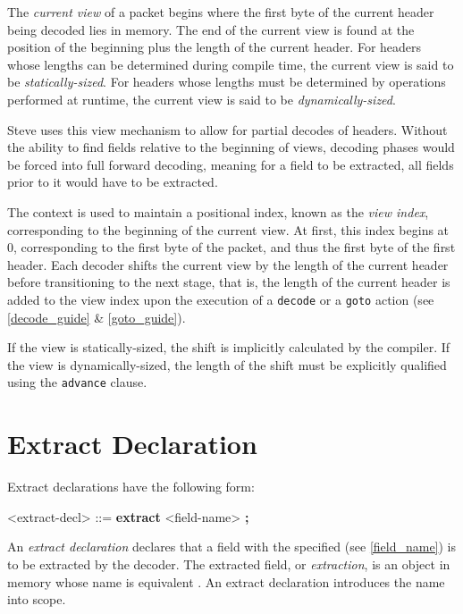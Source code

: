 The \textit{current view} of a packet begins where the first byte of the current header being decoded lies in memory. The end of the current view is found at the position of the beginning plus the length of the current header. For headers whose lengths can be determined during compile time, the current view is said to be \textit{statically-sized}. For headers whose lengths must be determined by operations performed at runtime, the current view is said to be \textit{dynamically-sized}.

Steve uses this view mechanism to allow for partial decodes of headers. Without the ability to find fields relative to the beginning of views, decoding phases would be forced into full forward decoding, meaning for a field to be extracted, all fields prior to it would have to be extracted.

The context is used to maintain a positional index, known as the \textit{view index}, corresponding to the beginning of the current view. At first, this index begins at 0, corresponding to the first byte of the packet, and thus the first byte of the first header. Each decoder shifts the current view by the length of the current header before transitioning to the next stage, that is, the length of the current header is added to the view index upon the execution of a \texttt{decode} or a \texttt{goto} action (see \ref{decode_guide} \& \ref{goto_guide}).

If the view is statically-sized, the shift is implicitly calculated by the compiler. If the view is dynamically-sized, the length of the shift must be explicitly qualified using the \texttt{\color{blue}advance} clause. 

\section{Extract Declaration} \label{extract_guide}

Extract declarations have the following form:

\begin{grammar}
<extract-decl> ::=
\textbf{extract} <field-name> \textbf{;}
\end{grammar}

An \textit{extract declaration} declares that a field with the specified  (see \ref{field_name}) is to be extracted by the decoder. The extracted field, or \textit{extraction}, is an object in memory whose name is equivalent . An extract declaration introduces the name  into scope.

